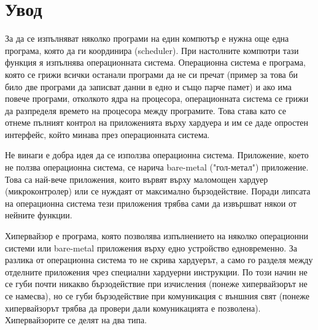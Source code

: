 \chapter*{Увод}


За да се изпълняват няколко програми на един компютър е нужна още една програма, която да ги координира (scheduler). При настолните компютри тази функция я изпълнява операционната система.
Операционна система е програма, която се грижи всички останали програми да не си пречат (пример за това би било две програми да записват данни в едно и също парче памет) и ако има повече програми, отколкото ядра на процесора, операционната система се грижи да разпределя времето на процесора между програмите. Това става като се отнеме пълният контрол на приложенията върху хардуера и им се даде опростен интерфейс, който минава през операционната система.

Не винаги е добра идея да се използва операционна система. Приложение, което не ползва операционна система, се нарича bare-metal ("гол-метал") приложение. Това са най-вече приложения, които вървят върху маломощен хардуер (микроконтролер) или се нуждаят от максимално бързодействие. Поради липсата на операционна система тези приложения трябва сами да извършват някои от нейните функции.

Хипервайзор е програма, която позволява изпълнението на няколко операционни системи или bare-metal приложения върху едно устройство едновременно. За разлика от операционна система то не скрива хардуерът, а само го разделя между отделните приложения чрез специални хардуерни инструкции. По този начин не се губи почти никакво бързодействие при изчисления (понеже хипервайзорът не се намесва), но се губи бързодействие при комуникация с външния свят (понеже хипервайзорът трябва да провери дали комуникацията е позволена).
Хипервайзорите се делят на два типа. %

